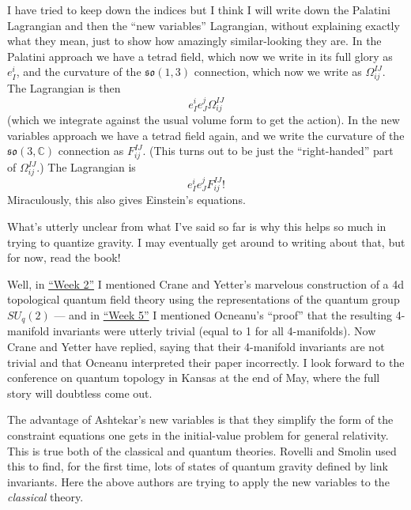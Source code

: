 \documentclass[12pt]{article}
\def\tightlist{}
\renewcommand{\texttt}[1]{%
  \begingroup
  \ttfamily
  \begingroup\lccode`~=`/\lowercase{\endgroup\def~}{/\discretionary{}{}{}}%
  \begingroup\lccode`~=`[\lowercase{\endgroup\def~}{[\discretionary{}{}{}}%
  \begingroup\lccode`~=`.\lowercase{\endgroup\def~}{.\discretionary{}{}{}}%
  \catcode`/=\active\catcode`[=\active\catcode`.=\active
  \scantokens{#1\noexpand}%
  \endgroup
}
\begin{document}
I have tried to keep down the indices but I think I will write down the
Palatini Lagrangian and then the ``new variables'' Lagrangian, without
explaining exactly what they mean, just to show how amazingly
similar-looking they are. In the Palatini approach we have a tetrad
field, which now we write in its full glory as \(e_I^i\), and the
curvature of the \(\mathfrak{so}(1,3)\) connection, which now we write
as \(\Omega_{ij}^{IJ}\). The Lagrangian is then
\[e_I^i e_J^j \Omega_{ij}^{IJ}\] (which we integrate against the usual
volume form to get the action). In the new variables approach we have a
tetrad field again, and we write the curvature of the
\(\mathfrak{so}(3,\mathbb{C})\) connection as \(F_{ij}^{IJ}\). (This
turns out to be just the ``right-handed'' part of \(\Omega_{ij}^{IJ}\).)
The Lagrangian is \[e_I^i e_J^j F_{ij}^{IJ} !\] Miraculously, this also
gives Einstein's equations.

What's utterly unclear from what I've said so far is why this helps so
much in trying to quantize gravity. I may eventually get around to
writing about that, but for now, read the book!

\noindent
Well, in \protect\hyperlink{week2}{``Week 2''} I mentioned Crane and
Yetter's marvelous construction of a 4d topological quantum field theory
using the representations of the quantum group \(SU_q(2)\) --- and in
\protect\hyperlink{week5}{``Week 5''} I mentioned Ocneanu's ``proof''
that the resulting 4-manifold invariants were utterly trivial (equal to
1 for all 4-manifolds). Now Crane and Yetter have replied, saying that
their 4-manifold invariants are not trivial and that Ocneanu interpreted
their paper incorrectly. I look forward to the conference on quantum
topology in Kansas at the end of May, where the full story will
doubtless come out.

\noindent
The advantage of Ashtekar's new variables is that they simplify the form
of the constraint equations one gets in the initial-value problem for
general relativity. This is true both of the classical and quantum
theories. Rovelli and Smolin used this to find, for the first time, lots
of states of quantum gravity defined by link invariants. Here the above
authors are trying to apply the new variables to the \emph{classical}
theory.
\end{document}
